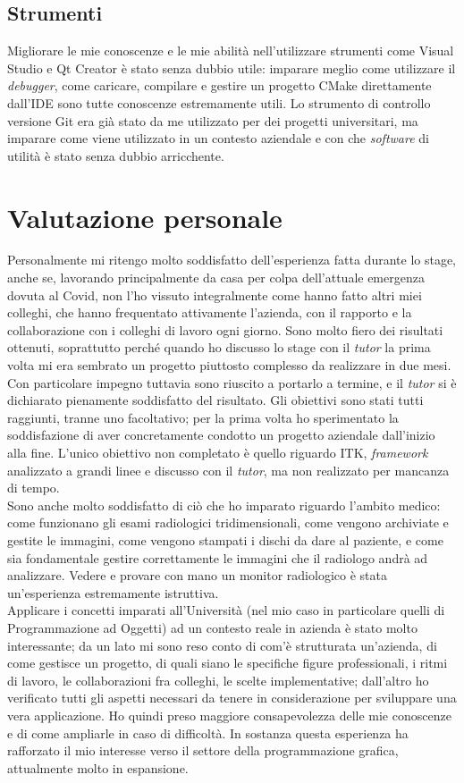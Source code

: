 \subsection{Strumenti}
Migliorare le mie conoscenze e le mie abilità nell'utilizzare strumenti come Visual Studio e Qt Creator è stato senza dubbio utile: imparare meglio come utilizzare il \emph{debugger}, come caricare, compilare e gestire un progetto CMake direttamente dall'IDE sono tutte conoscenze estremamente utili. Lo strumento di controllo versione Git era già stato da me utilizzato per dei progetti universitari, ma imparare come viene utilizzato in un contesto aziendale e con che \emph{software} di utilità è stato senza dubbio arricchente.

\section{Valutazione personale}
Personalmente mi ritengo molto soddisfatto dell'esperienza fatta durante lo stage, anche se, lavorando principalmente da casa per colpa dell'attuale emergenza dovuta al Covid, non l'ho vissuto integralmente come hanno fatto altri miei colleghi, che hanno frequentato attivamente l'azienda, con il rapporto e la collaborazione con i colleghi di lavoro ogni giorno. Sono molto fiero dei risultati ottenuti, soprattutto perché quando ho discusso lo stage con il \emph{tutor} la prima volta mi era sembrato un progetto piuttosto complesso da realizzare in due mesi. Con particolare impegno tuttavia sono riuscito a portarlo a termine, e il \emph{tutor} si è dichiarato pienamente soddisfatto del risultato. Gli obiettivi sono stati tutti raggiunti, tranne uno facoltativo; per la prima volta ho sperimentato la soddisfazione di aver concretamente condotto un progetto aziendale dall'inizio alla fine. L'unico obiettivo non completato è quello riguardo ITK, \emph{framework} analizzato a grandi linee e discusso con il \emph{tutor}, ma non realizzato per mancanza di tempo.
\\
Sono anche molto soddisfatto di ciò che ho imparato riguardo l'ambito medico: come funzionano gli esami radiologici tridimensionali, come vengono archiviate e gestite le immagini, come vengono stampati i dischi da dare al paziente, e come sia fondamentale gestire correttamente le immagini che il radiologo andrà ad analizzare. Vedere e provare con mano un monitor radiologico è stata un'esperienza estremamente istruttiva.
\\
Applicare i concetti imparati all'Università (nel mio caso in particolare quelli di
Programmazione ad Oggetti) ad un contesto reale in azienda è stato molto interessante;
da un lato mi sono reso conto di com'è strutturata un'azienda, di come gestisce un progetto, di quali siano le specifiche figure professionali, i ritmi di lavoro, le collaborazioni fra colleghi, le scelte implementative; dall'altro ho verificato tutti gli aspetti necessari da tenere in considerazione per sviluppare una vera applicazione. Ho quindi preso maggiore consapevolezza delle mie conoscenze e di come ampliarle in caso di difficoltà. In sostanza questa esperienza ha rafforzato il mio interesse verso il settore della programmazione grafica, attualmente molto in espansione.

